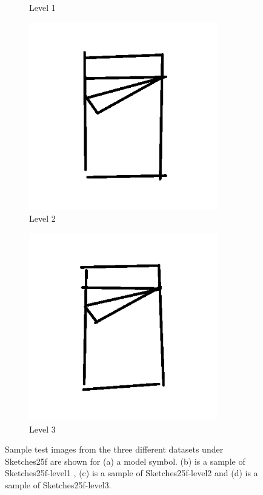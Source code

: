 \begin{figure}[h]
\begin{subfigure}[b]{0.25\textwidth}
                \caption{Level 1}
        \end{subfigure}
                \begin{subfigure}[b]{0.25\textwidth}
                \centering
                \includegraphics[width=0.9\textwidth]{figures/Results/Sketches25f/level2.png}
                \caption{Level 2}
        \end{subfigure}
                \begin{subfigure}[b]{0.25\textwidth}
                \centering
                \includegraphics[width=0.9\textwidth]{figures/Results/Sketches25f/level3.png}
                \caption{Level 3}
        \end{subfigure}
        \caption[Sample data from 'Sketches25f' dataset]{Sample test images from the three different datasets under Sketches25f are shown for (a) a model symbol. (b) is a sample of Sketches25f-level1 , (c)  is a sample of Sketches25f-level2 and (d) is a sample of Sketches25f-level3.}
        \label{fig:Sketches25fExamples}
\end{figure}


